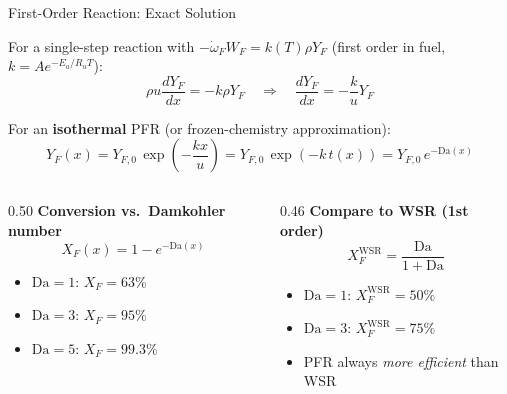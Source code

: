 \documentclass[12pt,aspectratio=169]{beamer}
\newcommand{\Da}{\mathrm{Da}}
\newcommand{\ddx}[1]{\frac{d#1}{dx}}
\newcommand{\wdot}{\dot{\omega}}
\begin{document}
\begin{frame}{First-Order Reaction: Exact Solution}

  For a single-step reaction with $-\wdot_F W_F = k(T)\rho Y_F$
  (first order in fuel, $k = Ae^{-E_a/R_u T}$):
  \[
    \rho u \ddx{Y_F} = -k\rho Y_F
    \quad\Rightarrow\quad
    \ddx{Y_F} = -\frac{k}{u} Y_F
  \]

  For an \textbf{isothermal} PFR (or frozen-chemistry approximation):
  \[
    Y_F(x) = Y_{F,0}\,\exp\!\left(-\frac{kx}{u}\right)
    = Y_{F,0}\,\exp\!\left(-k\,t(x)\right)
    = Y_{F,0}\,e^{-\Da(x)}
  \]

  \begin{columns}[t]
    \begin{column}{0.50\textwidth}
      \textbf{Conversion vs.\ Damkohler number}
      \[
        X_F(x) = 1 - e^{-\Da(x)}
      \]
      \begin{itemize}
        \item $\Da = 1$: $X_F = 63\%$
        \item $\Da = 3$: $X_F = 95\%$
        \item $\Da = 5$: $X_F = 99.3\%$
      \end{itemize}
    \end{column}
    \begin{column}{0.46\textwidth}
      \textbf{Compare to WSR (1st order)}
      \[
        X_F^{\text{WSR}} = \frac{\Da}{1+\Da}
      \]
      \begin{itemize}
        \item $\Da = 1$: $X_F^{\text{WSR}} = 50\%$
        \item $\Da = 3$: $X_F^{\text{WSR}} = 75\%$
        \item PFR always \emph{more efficient} than WSR
      \end{itemize}
    \end{column}
  \end{columns}
\end{frame}
\end{document}
